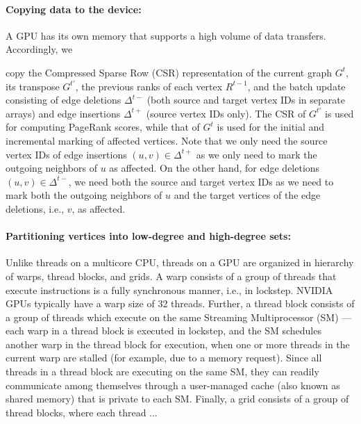\paragraph{Copying data to the device:}

A GPU has its own memory that supports a high volume of data transfers. Accordingly, we copy the Compressed Sparse Row (CSR) representation of the current graph $G^t$, its transpose $G^{t'}$, the previous ranks of each vertex $R^{t-1}$, and the batch update consisting of edge deletions $\Delta^{t-}$ (both source and target vertex IDs in separate arrays) and edge insertions $\Delta^{t+}$ (source vertex IDs only). The CSR of $G^{t'}$ is used for computing PageRank scores, while that of $G^t$ is used for the initial and incremental marking of affected vertices. Note that we only need the source vertex IDs of edge insertions $(u, v) \in \Delta^{t+}$ as we only need to mark the outgoing neighbors of $u$ as affected. On the other hand, for edge deletions $(u, v) \in \Delta^{t-}$, we need both the source and target vertex IDs as we need to mark both the outgoing neighbors of $u$ and the target vertices of the edge deletions, i.e., $v$, as affected.

\paragraph{Partitioning vertices into low-degree and high-degree sets:}

Unlike threads on a multicore CPU, threads on a GPU are organized in hierarchy of warps, thread blocks, and grids. A warp consists of a group of threads that execute instructions is a fully synchronous manner, i.e., in lockstep. NVIDIA GPUs typically have a warp size of 32 threads. Further, a thread block consists of a group of threads which execute on the same Streaming Multiprocessor (SM) --- each warp in a thread block is executed in lockstep, and the SM schedules another warp in the thread block for execution, when one or more threads in the current warp are stalled (for example, due to a memory request). Since all threads in a thread block are executing on the same SM, they can readily communicate among themselves through a user-managed cache (also known as shared memory) that is private to each SM. Finally, a grid consists of a group of thread blocks, where each thread ...

